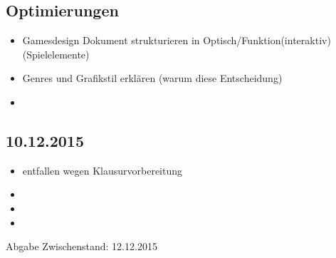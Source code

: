 \subsection{Optimierungen}
\begin{itemize}
\item Gamesdesign Dokument strukturieren in Optisch/Funktion(interaktiv) (Spielelemente)
\item Genres und Grafikstil erklären (warum diese Entscheidung)
\item 
\end{itemize}

\subsection{10.12.2015}
\begin{itemize}
\item entfallen wegen Klausurvorbereitung
\item 
\item 
\item 
\end{itemize}

Abgabe Zwischenstand: 12.12.2015


